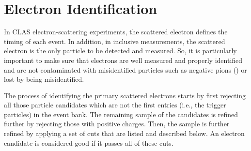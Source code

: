 

\section{Electron Identification}
\label{allCuts}

In CLAS electron-scattering %
experiments, the scattered electron defines the timing of each event. In addition, in inclusive measurements, the scattered electron is the only particle 
to be detected and measured. So, it is particularly important to make sure that electrons are well measured and properly identified and are 
not contaminated with misidentified particles such as negative pions (\pim) or lost by being misidentified. %

%
The process of identifying the primary scattered electrons starts by first rejecting all those particle 
candidates which are not the first entries (i.e., the trigger particles) in the event bank. The 
remaining sample of the candidates is refined further by rejecting those with positive
charges. Then, the sample is further refined %
by applying a set of cuts %
that are listed and described below. An electron candidate is considered good if it passes %
all of these cuts.
%

